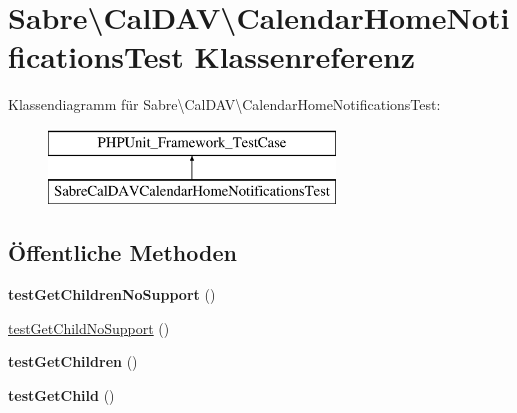 \hypertarget{class_sabre_1_1_cal_d_a_v_1_1_calendar_home_notifications_test}{}\section{Sabre\textbackslash{}Cal\+D\+AV\textbackslash{}Calendar\+Home\+Notifications\+Test Klassenreferenz}
\label{class_sabre_1_1_cal_d_a_v_1_1_calendar_home_notifications_test}
Klassendiagramm für Sabre\textbackslash{}Cal\+D\+AV\textbackslash{}Calendar\+Home\+Notifications\+Test\+:\begin{figure}[H]
\begin{center}
\leavevmode
\includegraphics[height=2.000000cm]{class_sabre_1_1_cal_d_a_v_1_1_calendar_home_notifications_test}
\end{center}
\end{figure}
\subsection*{Öffentliche Methoden}
\begin{DoxyCompactItemize}
\item 
\mbox{\label{class_sabre_1_1_cal_d_a_v_1_1_calendar_home_notifications_test_a4149c65828f49d5a134afb1977152cba}} 
{\bfseries test\+Get\+Children\+No\+Support} ()
\item 
\mbox{\hyperlink{class_sabre_1_1_cal_d_a_v_1_1_calendar_home_notifications_test_ab1a7fd64b00a7dc904d00f5ccbde2ec6}{test\+Get\+Child\+No\+Support}} ()
\item 
\mbox{\label{class_sabre_1_1_cal_d_a_v_1_1_calendar_home_notifications_test_a53d5edff6d89a4a66ac5bec7d9721934}} 
{\bfseries test\+Get\+Children} ()
\item 
\mbox{\label{class_sabre_1_1_cal_d_a_v_1_1_calendar_home_notifications_test_a576b0581f037aa0c1285d6980506f2ad}} 
{\bfseries test\+Get\+Child} ()
\end{DoxyCompactItemize}


